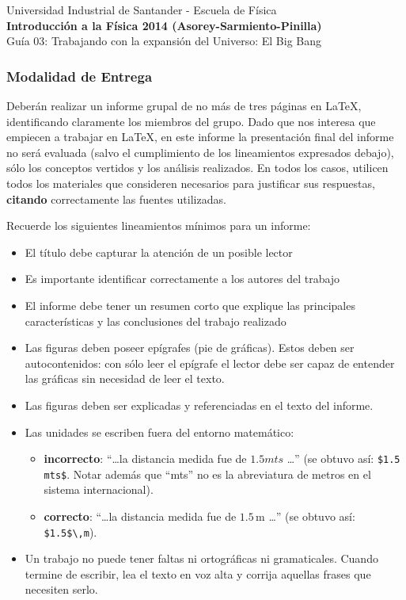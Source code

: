 \documentclass[a4paper,11pt]{article}
\begin{document}
\begin{center}
  {\small{Universidad Industrial de Santander - Escuela de Física}}\\
  {\bf{Introducción a la Física 2014 (Asorey-Sarmiento-Pinilla)}}\\
  \vspace{0.3cm}
  Guía 03: Trabajando con la expansión del Universo: El Big Bang
\end{center}

\renewcommand{\labelenumi}{\arabic{enumi})}
\renewcommand{\labelenumii}{\arabic{enumii})}

\subsubsection*{Modalidad de Entrega}
Deberán realizar un informe grupal de no más de tres páginas en \LaTeX, identificando claramente los miembros del grupo. Dado que nos interesa que empiecen a trabajar en \LaTeX, en este informe la presentación final del informe no será evaluada (salvo el cumplimiento de los lineamientos expresados debajo), sólo los conceptos vertidos y los análisis realizados. En todos los casos, utilicen todos los materiales que consideren necesarios para justificar sus respuestas, {\bf{citando}} correctamente las fuentes utilizadas.

Recuerde los siguientes lineamientos mínimos para un informe:
\begin{itemize}
  \item El título debe capturar la atención de un posible lector
  \item Es importante identificar correctamente a los autores del trabajo
  \item El informe debe tener un resumen corto que explique las principales características y las conclusiones del trabajo realizado
  \item Las figuras deben poseer epígrafes (pie de gráficas). Estos deben ser autocontenidos: con sólo leer el epígrafe el lector debe ser capaz de entender las gráficas sin necesidad de leer el texto. 
  \item Las figuras deben ser explicadas y referenciadas en el texto del informe.
  \item Las unidades se escriben fuera del entorno matemático: 
  \begin{itemize}
    \item {\bf{incorrecto}}: ``\ldots la distancia medida fue de $1.5 mts$ \ldots'' (se obtuvo así: \verb|$1.5 mts$|. Notar además que ``mts'' no es la abreviatura de metros en el sistema internacional).
    \item {\bf{correcto}}: ``\ldots la distancia medida fue de $1.5$\,m \ldots'' (se obtuvo así: \verb|$1.5$\,m|).
\end{itemize}
  \item Un trabajo no puede tener faltas ni ortográficas ni gramaticales. Cuando termine de escribir, lea el texto en voz alta y corrija aquellas frases que necesiten serlo.
\end{itemize}
\end{document}
